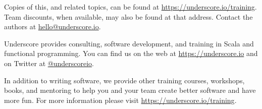 \begin{center}

Copies of this, and related topics,
can be found at \href{https://underscore.io/training}{https://underscore.io/training}.
Team discounts, when available, may also be found at that address.
Contact the authors at \href{mailto:hello@underscore.io}{hello@underscore.io}.

\vspace{3em}

Underscore provides consulting, software development, and training in Scala and functional programming.
You can find us on the web at \href{https://underscore.io}{https://underscore.io}
and on Twitter at \href{https://twitter.com/underscoreio}{@underscoreio}.

In addition to writing software,
we provide other training courses, workshops, books, and mentoring
to help you and your team create better software and have more fun.
For more information please visit
\href{https://underscore.io/training}{https://underscore.io/training}.

\end{center}
